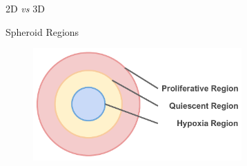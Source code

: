 \begin{frame}{2D \textit{vs} 3D}
    \begin{figure}[!htb]
    \centering
     \hspace*{0.3cm}
     \hspace*{0.3cm}
    \label{fig:2d_vs_3d}
    \end{figure}
\end{frame}

\begin{frame}{Spheroid Regions}
    \begin{figure}
        \centering
        \includegraphics[width=8cm]{figures/introduction/spheroid_regions}
        \label{fig:spheroid_regions}
    \end{figure}
\end{frame}

